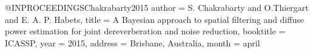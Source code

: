 @INPROCEEDINGS{Chakrabarty2015
    author = {S. Chakrabarty and O.Thiergart and E. A. P. Habets},
    title = {A {B}ayesian approach to spatial filtering and diffuse power estimation for joint dereverberation and noise reduction},
    booktitle = ICASSP,
    year = {2015},
    address = {Brisbane, Australia},
    month = april
}